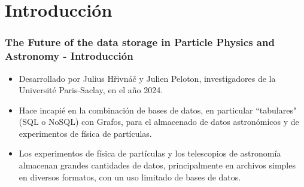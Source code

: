 \section{Introducción}

\begin{frame}
    \frametitle{The Future of the data storage in Particle Physics and Astronomy - Introducción}

    \begin{itemize}
        \item Desarrollado por Julius Hřivnáč y Julien Peloton, investigadores de la Université Paris-Saclay, en el año 2024.

         
        
        \item Hace incapié en la combinación de bases de datos, en particular ``tabulares" (SQL o NoSQL) con Grafos, para el almacenado de datos astronómicos y de experimentos de física de partículas.

          

        \item Los experimentos de física de partículas y los telescopios de astronomía almacenan grandes cantidades de datos, principalmente en archivos simples en diversos formatos, con un uso limitado de bases de datos.
        
    \end{itemize}
    
\end{frame}

